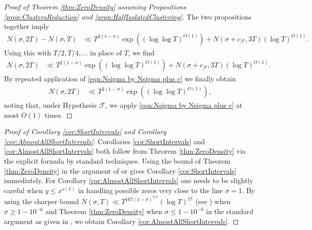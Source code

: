 \documentclass[12pt]{amsart}
\theoremstyle{plain}
\theoremstyle{definition}
\theoremstyle{remark}
\begin{document}
\begin{proof}[Proof of Theorem \ref{thm:ZeroDensity} assuming Propositions \ref{prop:ClustersReduction} and \ref{prop:HalfIsolatedClustering}]
The two propositions together imply
\begin{align*}
N(\sigma,2T) - N(\sigma,T) &\ll T^{2(1-\sigma)}\exp((\log \log T)^{O(1)}) + N(\sigma+c_\mathcal{F},3T) (\log T)^{O(1)}.
\end{align*}
Using this with $T/2,T/4,\ldots$ in place of $T$, we find
\begin{align}\label{eqn:Nsigma by Nsigma plus c}
N(\sigma,2T) &\ll T^{2(1-\sigma)}\exp((\log \log T)^{O(1)}) + N(\sigma+c_\mathcal{F},3T) (\log T)^{O(1)}.
\end{align}
By repeated application of \eqref{eqn:Nsigma by Nsigma plus c} we finally obtain
\begin{align*}
N(\sigma,2T) &\ll T^{2(1-\sigma)}\exp((\log \log T)^{O(1)}),
\end{align*}
noting that, under Hypothesis $\mathcal{F}$, we apply \eqref{eqn:Nsigma by Nsigma plus c} at most $O(1)$ times.
\end{proof}
%
%
%
%
\begin{proof}[Proof of Corollary \ref{cor:ShortIntervals} and Corollary \ref{cor:AlmostAllShortIntervals}]
Corollaries \ref{cor:ShortIntervals} and \ref{cor:AlmostAllShortIntervals} both follow from Theorem \ref{thm:ZeroDensity} via the explicit formula by standard techniques. Using the bound of Theorem \ref{thm:ZeroDensity} in the argument of \cite[Theorem 10.5]{IK2004} or \cite[Section 7.1]{Har2007} gives Corollary \ref{cor:ShortIntervals} immediately. For Corollary \ref{cor:AlmostAllShortIntervals} one needs to be slightly careful when $y\le x^{o(1)}$ in handling possible zeros very close to the line $\sigma=1$. By using the sharper bound $N(\sigma,T)\ll T^{167(1-\sigma)^{3/2}}(\log{T})^{17}$ (see \cite[Corollary 12.5]{Mon1971}) when $\sigma\ge 1-10^{-6}$ and Theorem \ref{thm:ZeroDensity} when $\sigma\le 1-10^{-6}$ in the standard argument as given in \cite[Section 9.1]{Har2007}, we obtain Corollary \ref{cor:AlmostAllShortIntervals}.
\end{proof}
%
%
%
%
\end{document}
